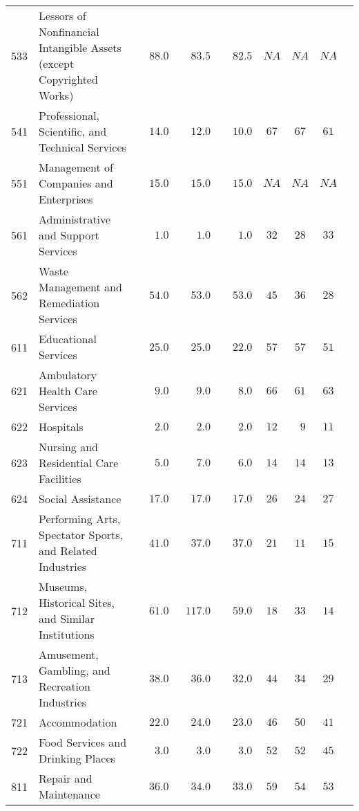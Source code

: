 \documentclass[9pt, oneside]{article}   	%
\begin{document}
\begin{longtable}{lp{3 in}ccccccc}
533  & Lessors of Nonfinancial Intangible Assets (except Copyrighted Works) & $\phantom{00}88.0$ & $\phantom{00}83.5$ & $\phantom{00}82.5$ & $NA$ & $NA$ & $NA$ \\
541  & Professional, Scientific, and Technical Services & $\phantom{00}14.0$ & $\phantom{00}12.0$ & $\phantom{00}10.0$ & $67$ & $67$ & $61$ \\
551  & Management of Companies and Enterprises & $\phantom{00}15.0$ & $\phantom{00}15.0$ & $\phantom{00}15.0$ & $NA$ & $NA$ & $NA$ \\
561  & Administrative and Support Services & $\phantom{000}1.0$ & $\phantom{000}1.0$ & $\phantom{000}1.0$ & $32$ & $28$ & $33$ \\
562  & Waste Management and Remediation Services & $\phantom{00}54.0$ & $\phantom{00}53.0$ & $\phantom{00}53.0$ & $45$ & $36$ & $28$ \\
611  & Educational Services & $\phantom{00}25.0$ & $\phantom{00}25.0$ & $\phantom{00}22.0$ & $57$ & $57$ & $51$ \\
621  & Ambulatory Health Care Services & $\phantom{000}9.0$ & $\phantom{000}9.0$ & $\phantom{000}8.0$ & $66$ & $61$ & $63$ \\
622  & Hospitals & $\phantom{000}2.0$ & $\phantom{000}2.0$ & $\phantom{000}2.0$ & $12$ & $\phantom{0}9$ & $11$ \\
623  & Nursing and Residential Care Facilities & $\phantom{000}5.0$ & $\phantom{000}7.0$ & $\phantom{000}6.0$ & $14$ & $14$ & $13$ \\
624  & Social Assistance & $\phantom{00}17.0$ & $\phantom{00}17.0$ & $\phantom{00}17.0$ & $26$ & $24$ & $27$ \\
711  & Performing Arts, Spectator Sports, and Related Industries & $\phantom{00}41.0$ & $\phantom{00}37.0$ & $\phantom{00}37.0$ & $21$ & $11$ & $15$ \\
712  & Museums, Historical Sites, and Similar Institutions & $\phantom{00}61.0$ & $\phantom{0}117.0$ & $\phantom{00}59.0$ & $18$ & $33$ & $14$ \\
713  & Amusement, Gambling, and Recreation Industries & $\phantom{00}38.0$ & $\phantom{00}36.0$ & $\phantom{00}32.0$ & $44$ & $34$ & $29$ \\
721  & Accommodation & $\phantom{00}22.0$ & $\phantom{00}24.0$ & $\phantom{00}23.0$ & $46$ & $50$ & $41$ \\
722  & Food Services and Drinking Places & $\phantom{000}3.0$ & $\phantom{000}3.0$ & $\phantom{000}3.0$ & $52$ & $52$ & $45$ \\
811  & Repair and Maintenance & $\phantom{00}36.0$ & $\phantom{00}34.0$ & $\phantom{00}33.0$ & $59$ & $54$ & $53$ \\

\end{longtable}
\end{document}
